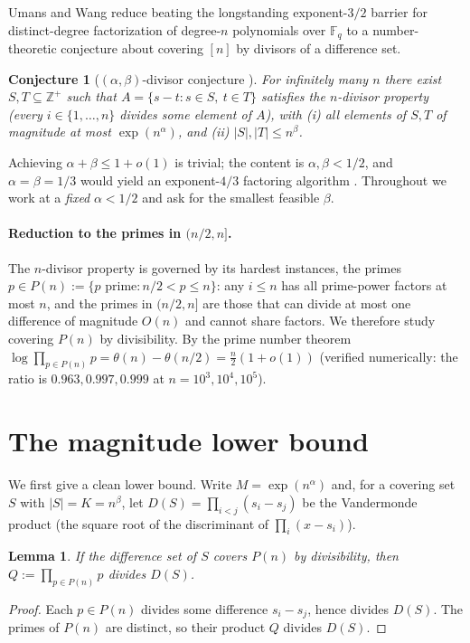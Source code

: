 \documentclass[11pt]{article}
\newtheorem{lemma}[theorem]{Lemma}
\newtheorem{conjecture}[theorem]{Conjecture}
\theoremstyle{definition}
\newcommand{\Z}{\mathbb{Z}}
\begin{document}
Umans and Wang \cite{UW} reduce beating the longstanding exponent-$3/2$ barrier for
distinct-degree factorization of degree-$n$ polynomials over $\mathbb{F}_q$ to a
number-theoretic conjecture about covering $[n]$ by divisors of a difference set.

\begin{conjecture}[$(\alpha,\beta)$-divisor conjecture \cite{UW}]\label{conj:uw}
For infinitely many $n$ there exist $S,T\subseteq\Z^{+}$ such that
$A=\{s-t : s\in S,\ t\in T\}$ satisfies the $n$-divisor property
(every $i\in\{1,\dots,n\}$ divides some element of $A$), with
(i) all elements of $S,T$ of magnitude at most $\exp(n^{\alpha})$, and
(ii) $|S|,|T|\le n^{\beta}$.
\end{conjecture}

Achieving $\alpha+\beta\le 1+o(1)$ is trivial; the content is $\alpha,\beta<1/2$,
and $\alpha=\beta=1/3$ would yield an exponent-$4/3$ factoring algorithm \cite{UW}.
Throughout we work at a \emph{fixed} $\alpha<1/2$ and ask for the smallest feasible
$\beta$.

\paragraph{Reduction to the primes in $(n/2,n]$.}
The $n$-divisor property is governed by its hardest instances, the primes
$p\in P(n):=\{p \text{ prime}: n/2<p\le n\}$: any $i\le n$ has all prime-power
factors at most $n$, and the primes in $(n/2,n]$ are those that can divide at most
one difference of magnitude $O(n)$ and cannot share factors. We therefore study
covering $P(n)$ by divisibility. By the prime number theorem
$\log\prod_{p\in P(n)}p=\theta(n)-\theta(n/2)=\tfrac{n}{2}(1+o(1))$
(verified numerically: the ratio is $0.963,0.997,0.999$ at $n=10^3,10^4,10^5$).

\section{The magnitude lower bound}

We first give a clean lower bound. Write $M=\exp(n^{\alpha})$ and, for a covering
set $S$ with $|S|=K=n^{\beta}$, let
$D(S)=\prod_{i<j}(s_i-s_j)$ be the Vandermonde product (the square root of the
discriminant of $\prod_i(x-s_i)$).

\begin{lemma}\label{lem:divides}
If the difference set of $S$ covers $P(n)$ by divisibility, then
$Q:=\prod_{p\in P(n)}p$ divides $D(S)$.
\end{lemma}
\begin{proof}
Each $p\in P(n)$ divides some difference $s_i-s_j$, hence divides $D(S)$. The
primes of $P(n)$ are distinct, so their product $Q$ divides $D(S)$.
\end{proof}
\end{document}
